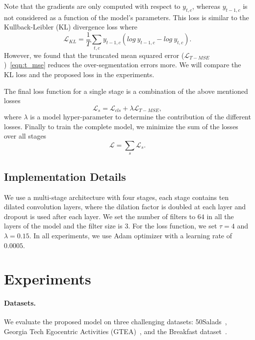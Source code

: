 \documentclass[10pt,twocolumn,letterpaper]{article}
\begin{document}
Note that the gradients are only computed 
with respect to $y_{t,c}$, whereas $y_{t-1,c}$ is not considered as a function 
of the model's parameters. This loss is similar to the Kullback-Leibler (KL) 
divergence loss where 
\begin{equation}
\mathcal{L}_{KL} = \frac{1}{T}\sum_{t,c} y_{t-1,c} (log\ y_{t-1,c} - log\ y_{t,c}).
\end{equation}
However, we found that the truncated mean squared error ($\mathcal{L}_{T-MSE}$)~\eqref{eqn:t_mse} 
reduces the over-segmentation errors more. We will compare the KL loss and the proposed 
loss in the experiments.

The final loss function for a single stage is a combination of the 
above mentioned losses
\begin{equation}
\mathcal{L}_s = \mathcal{L}_{cls} + \lambda \mathcal{L}_{T-MSE}, 
\end{equation}
where $\lambda$ is a model hyper-parameter to determine the contribution of 
the different losses. Finally to train the complete model, we minimize the 
sum of the losses over all stages
\begin{equation}
\mathcal{L} = \sum_s \mathcal{L}_{s} . 
\end{equation}


\subsection{Implementation Details}
\label{sec:implementation details}
We use a multi-stage architecture with four stages, each stage contains 
ten dilated convolution layers, where the dilation factor is doubled at 
each layer and dropout is used after each layer. We set the number of 
filters to $64$ in all the layers of the model and the filter size is $3$. 
For the loss function, we set $\tau = 4$ and $\lambda = 0.15$. In all experiments, 
we use Adam optimizer with a learning rate of $0.0005$.
\section{Experiments}
\paragraph{Datasets.} We evaluate the proposed model on three challenging 
datasets: 50Salads~\cite{stein2013combining}, Georgia Tech Egocentric Activities 
(GTEA)~\cite{fathi2011learning}, and the Breakfast dataset~\cite{kuehne2014language}.
\end{document}
